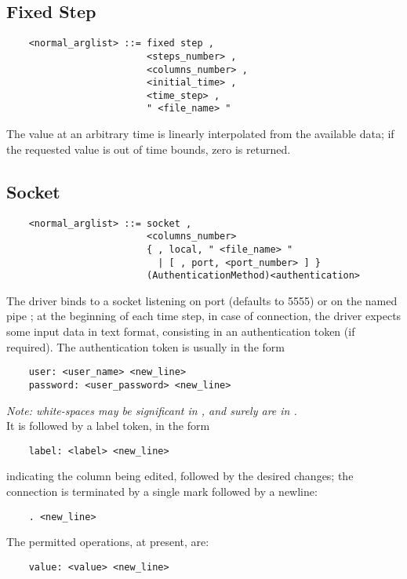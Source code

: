 \subsection{Fixed Step}
\begin{verbatim}
    <normal_arglist> ::= fixed step , 
                         <steps_number> ,
                         <columns_number> ,
                         <initial_time> ,
                         <time_step> ,
                         " <file_name> "
\end{verbatim}
The value at an arbitrary time is linearly interpolated from the available
data; if the requested value is out of time bounds, zero is returned.



\subsection{Socket}
\begin{verbatim}
    <normal_arglist> ::= socket , 
                         <columns_number>
                         { , local, " <file_name> " 
                           | [ , port, <port_number> ] }
                         (AuthenticationMethod)<authentication>
\end{verbatim}
The driver binds to a socket listening on port  
(defaults to 5555) or on the named pipe ; at the
beginning of each time step, in case of connection, the driver expects some
input data in text format, consisting in an authentication token 
(if required).
The authentication token is usually in the form
\begin{verbatim}
    user: <user_name> <new_line>
    password: <user_password> <new_line>
\end{verbatim}
{\em 
    Note: white-spaces may be significant in , 
    and surely are in .
} \\    
It is followed by a label token, in the form
\begin{verbatim}
    label: <label> <new_line>
\end{verbatim}
indicating the column being edited, followed by the desired changes; 
the connection is terminated by a single mark followed by a newline:
\begin{verbatim}
    . <new_line>
\end{verbatim}
The permitted operations, at present, are:
\begin{verbatim}
    value: <value> <new_line>
\end{verbatim}
